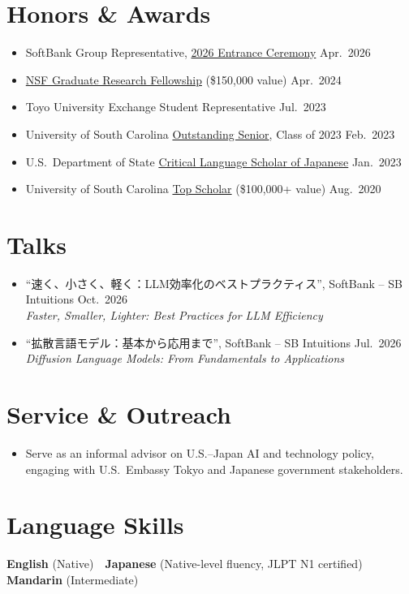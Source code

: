 \documentclass[10pt,a4paper]{article}
\newcommand{\cvlink}[2]{\href{#1}{#2}}
\begin{document}
\section{Honors \& Awards}
\begin{itemize}[leftmargin=*, nosep, itemsep=3pt]
  \item SoftBank Group Representative, \cvlink{https://www.softbank.jp/sbnews/entry/20260403_01}{2026 Entrance Ceremony} \hfill Apr.\ 2026
  \item \cvlink{https://cse.sc.edu/news/lex-whalen-wins-nsf-graduate-research-fellowship}{NSF Graduate Research Fellowship} (\$150,000 value) \hfill Apr.\ 2024
  \item Toyo University Exchange Student Representative \hfill Jul.\ 2023
  \item University of South Carolina \cvlink{https://web.cse.sc.edu/news/outstanding-senior-award-2023}{Outstanding Senior}, Class of 2023 \hfill Feb.\ 2023
  \item U.S.\ Department of State \cvlink{https://sc.edu/about/offices_and_divisions/fellowships_and_scholar_programs/news/national_fellowships_news/2023/cls_spring23.php}{Critical Language Scholar of Japanese} \hfill Jan.\ 2023
  \item University of South Carolina \cvlink{https://sc.edu/about/offices_and_divisions/fellowships_and_scholar_programs/national_fellowships/usc_award_winners/recipient.php?wid=714}{Top Scholar} (\$100,000+ value) \hfill Aug.\ 2020
\end{itemize}

\section{Talks}
\begin{itemize}[leftmargin=*, nosep, itemsep=3pt]
  \item ``速く、小さく、軽く：LLM効率化のベストプラクティス'', SoftBank -- SB Intuitions \hfill Oct.\ 2026\\
        {\footnotesize\textit{Faster, Smaller, Lighter: Best Practices for LLM Efficiency}}
  \item ``拡散言語モデル：基本から応用まで'', SoftBank -- SB Intuitions \hfill Jul.\ 2026\\
        {\footnotesize\textit{Diffusion Language Models: From Fundamentals to Applications}}
\end{itemize}

\section{Service \& Outreach}
\begin{itemize}[leftmargin=*, nosep, itemsep=3pt]
  \item Serve as an informal advisor on U.S.--Japan AI and technology policy, engaging with U.S.\ Embassy Tokyo and Japanese government stakeholders.
\end{itemize}

\section{Language Skills}
\noindent\textbf{English} (Native) \,\textperiodcentered\, \textbf{Japanese} (Native-level fluency, JLPT N1 certified) \,\textperiodcentered\, \textbf{Mandarin} (Intermediate)
\end{document}
